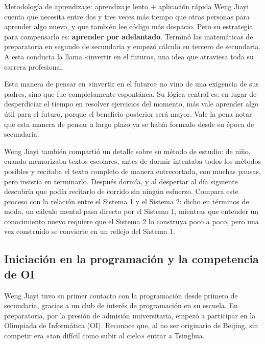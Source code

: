 \documentclass[a4paper]{article}
\begin{document}
\begin{importantbox}{Metodología de aprendizaje: aprendizaje lento + aplicación rápida}
Weng Jiayi cuenta que necesita entre dos y tres veces más tiempo que otras personas para aprender algo nuevo, y que también lee código más despacio. Pero su estrategia para compensarlo es: \textbf{aprender por adelantado}. Terminó las matemáticas de preparatoria en segundo de secundaria y empezó cálculo en tercero de secundaria. A esta conducta la llama «invertir en el futuro», una idea que atraviesa toda su carrera profesional.
\end{importantbox}

Esta manera de pensar en «invertir en el futuro» no vino de una exigencia de sus padres, sino que fue completamente espontánea. Su lógica central es: en lugar de desperdiciar el tiempo en resolver ejercicios del momento, más vale aprender algo útil para el futuro, porque el beneficio posterior será mayor. Vale la pena notar que esta manera de pensar a largo plazo ya se había formado desde su época de secundaria.

Weng Jiayi también compartió un detalle sobre su método de estudio: de niño, cuando memorizaba textos escolares, antes de dormir intentaba todos los métodos posibles y recitaba el texto completo de manera entrecortada, con muchas pausas, pero insistía en terminarlo. Después dormía, y al despertar al día siguiente descubría que podía recitarlo de corrido sin ningún esfuerzo. Compara este proceso con la relación entre el Sistema 1 y el Sistema 2: dicho en términos de moda, un cálculo mental pasa directo por el Sistema 1, mientras que entender un conocimiento nuevo requiere que el Sistema 2 lo construya poco a poco, pero una vez construido se convierte en un reflejo del Sistema 1.

\subsection{Iniciación en la programación y la competencia de OI}

Weng Jiayi tuvo su primer contacto con la programación desde primero de secundaria, gracias a un club de interés de programación en su escuela. En preparatoria, por la presión de admisión universitaria, empezó a participar en la Olimpiada de Informática (OI). Reconoce que, al no ser originario de Beijing, sin competir era «tan difícil como subir al cielo» entrar a Tsinghua.
\end{document}
